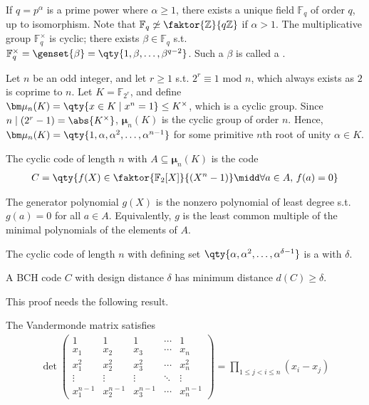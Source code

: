 If $q = p^\alpha$ is a prime power where $\alpha \geq 1$, there exists a unique field $\mathbb F_q$ of order $q$, up to isomorphism.
Note that $\mathbb F_q \not\simeq \faktor{\mathbb Z}{q\mathbb Z}$ if $\alpha > 1$.
The multiplicative group $\mathbb F_q^\times$ is cyclic; there exists $\beta \in \mathbb F_q$ s.t. $\mathbb F_q^\times = \genset{\beta} = \qty{1, \beta, \dots, \beta^{q-2}}$.
Such a $\beta$ is called a .

Let $n$ be an odd integer, and let $r \geq 1$ s.t. $2^r \equiv 1$ mod $n$, which always exists as $2$ is coprime to $n$.
Let $K = \mathbb F_{2^r}$, and define $\bm \mu_n(K) = \qty{x \in K \mid x^n = 1} \leq K^\times$, which is a cyclic group.
Since $n \mid (2^r - 1) = \abs{K^\times}$, $\bm \mu_n(K)$ is the cyclic group of order $n$.
Hence, $\bm \mu_n(K) = \qty{1, \alpha, \alpha^2, \dots, \alpha^{n-1}}$ for some primitive $n$th root of unity $\alpha \in K$.
\begin{definition}
    The cyclic code of length $n$ with  $A \subseteq \bm\mu_n(K)$ is the code
    \begin{align*}
        C = \qty{f(X) \in \faktor{\mathbb F_2[X]}{(X^n - 1)} \midd \forall a \in A,\, f(a) = 0}
    \end{align*}
\end{definition}
The generator polynomial $g(X)$ is the nonzero polynomial of least degree s.t. $g(a) = 0$ for all $a \in A$.
Equivalently, $g$ is the least common multiple of the minimal polynomials of the elements of $A$.
\begin{definition}
    The cyclic code of length $n$ with defining set $\qty{\alpha, \alpha^2, \dots, \alpha^{\delta - 1}}$ is a  with  $\delta$.
\end{definition}
\begin{theorem}
    A BCH code $C$ with design distance $\delta$ has minimum distance $d(C) \geq \delta$.
\end{theorem}
This proof needs the following result.
\begin{lemma}
    The Vandermonde matrix satisfies
    \begin{align*}
        \det \begin{pmatrix}
            1 & 1 & 1 & \cdots & 1 \\
            x_1 & x_2 & x_3 & \cdots & x_n \\
            x_1^2 & x_2^2 & x_3^2 & \cdots & x_n^2 \\
            \vdots & \vdots & \vdots & \ddots & \vdots \\
            x_1^{n-1} & x_2^{n-1} & x_3^{n-1} & \cdots & x_n^{n-1}
        \end{pmatrix} = \prod_{1 \leq j < i \leq n} (x_i - x_j)
    \end{align*}
\end{lemma}
